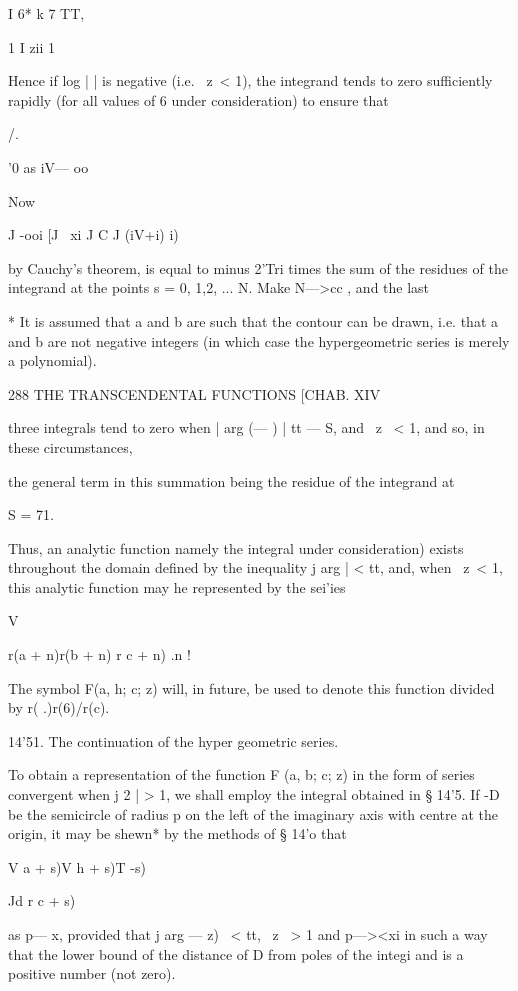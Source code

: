   I 6* k 7 TT,

1 I zii 1

Hence if log | | is negative (i.e. \ z\ < 1), the integrand tends to
zero sufficiently rapidly (for all values of 6 under consideration) to
ensure that

/.

'0 as iV— oo

Now

J -ooi [J ~xi J C J (iV+i) i)

by Cauchy's theorem, is equal to minus 2'Tri times the sum of the
residues of the integrand at the points s = 0, 1,2, ... N. Make N—>cc
, and the last

* It is assumed that a and b are such that the contour can be drawn,
i.e. that a and b are not negative integers (in which case the
hypergeometric series is merely a polynomial).

288 THE TRANSCENDENTAL FUNCTIONS [CHAB. XIV

three integrals tend to zero when | arg (— ) | tt — S, and \ z \ < 1,
and so, in these circumstances,

the general term in this summation being the residue of the integrand
at

S = 71.

Thus, an analytic function namely the integral under consideration)
exists throughout the domain defined by the inequality j arg | < tt,
and, when \ z\ < 1, this analytic function may he represented by the
sei'ies

V

r(a + n)r(b + n) r c + n) .n !

The symbol F(a, h; c; z) will, in future, be used to denote this
function divided by r( .)r(6)/r(c).

14'51. The continuation of the hyper geometric series.

To obtain a representation of the function F (a, b; c; z) in the form
of series convergent when j 2 | > 1, we shall employ the integral
obtained in § 14'5. If -D be the semicircle of radius p on the left of
the imaginary axis with centre at the origin, it may be shewn* by the
methods of § 14'o that

V a + s)V h + s)T -s)

Jd r c + s)

as p— x, provided that j arg — z) \ < tt, \ z \ > 1 and p—><xi in
such a way that the lower bound of the distance of D from poles of the
integi and is a positive number (not zero).

